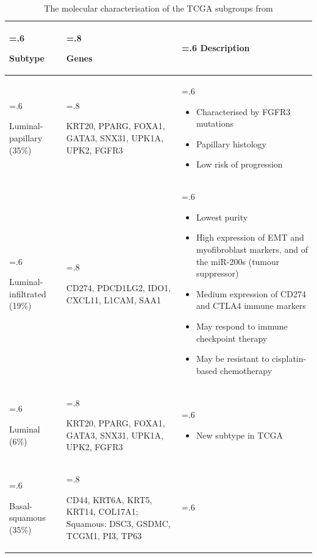 \begin{table}[htbp]
\centering
\caption{The molecular characterisation of the TCGA subgroups from \cite{Robertson2017-mg}}
\begin{tabularx}{\textwidth}{
  >{\hsize=.6\hsize\raggedright\arraybackslash}X
  >{\hsize=.8\hsize\raggedright\arraybackslash}X
  >{\hsize=.6\hsize\arraybackslash}X
}
\toprule
Subtype & Genes & Description \\
\midrule
Luminal-papillary (35\%) & KRT20, PPARG, FOXA1, GATA3, SNX31, UPK1A, UPK2, FGFR3 & 
\begin{itemize}[leftmargin=*, nosep, after=\vspace{-\baselineskip}, before=\vspace{-.6\baselineskip}]
    \item Characterised by FGFR3 mutations
    \item Papillary histology
    \item Low risk of progression
\end{itemize} \\
\midrule
Luminal-infiltrated (19\%) & CD274, PDCD1LG2, IDO1, CXCL11, L1CAM, SAA1 & 
\begin{itemize}[leftmargin=*, nosep, after=\vspace{-\baselineskip}, before=\vspace{-.6\baselineskip}]
    \item Lowest purity
    \item High expression of EMT and myofibroblast markers, and of the miR-200s (tumour suppressor)
    \item Medium expression of CD274 and CTLA4 immune markers
    \item May respond to immune checkpoint therapy
    \item May be resistant to cisplatin-based chemotherapy
\end{itemize} \\
\midrule
Luminal (6\%) & KRT20, PPARG, FOXA1, GATA3, SNX31, UPK1A, UPK2, FGFR3 & 
\begin{itemize}[leftmargin=*, nosep, after=\vspace{-\baselineskip}, before=\vspace{-.6\baselineskip}]
    \item New subtype in TCGA
\end{itemize} \\
\midrule
Basal-squamous (35\%) & CD44, KRT6A, KRT5, KRT14, COL17A1; Squamous: DSC3, GSDMC, TCGM1, PI3, TP63 & 
\begin{itemize}[leftmargin=*, nosep, after=\vspace{-\baselineskip}, before=\vspace{-.6\baselineskip}]

\end{itemize}
\end{tabularx}
\end{table}
